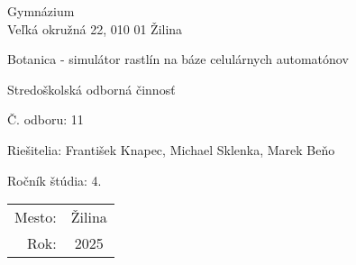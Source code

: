 \documentclass[12pt]{article}
\begin{document}
%
%
\begin{titlepage}
    \setlength{\parindent}{0pt}

    \begin{center}
        Gymnázium \\
        Veľká okružná 22, 010 01 Žilina

        \vspace{7cm}
        \Huge Botanica - simulátor rastlín na báze celulárnych automatónov

        \vspace{1.13cm}
        \Large Stredoškolská odborná činnosť

        \vspace{2.12cm}
        \normalsize Č. odboru: 11
    \end{center}

    \vfill

    \begin{minipage}{0.75\textwidth}
        Riešitelia: František Knapec, Michael Sklenka, Marek Beňo \par
        Ročník štúdia: 4.
    \end{minipage}
    \hfill
    \begin{minipage}{0.23\textwidth}
        \hfil %
        \begin{tabular}{rc}
            Mesto: & Žilina \\
            Rok:   & 2025
        \end{tabular}
    \end{minipage}
\end{titlepage}
\end{document}
